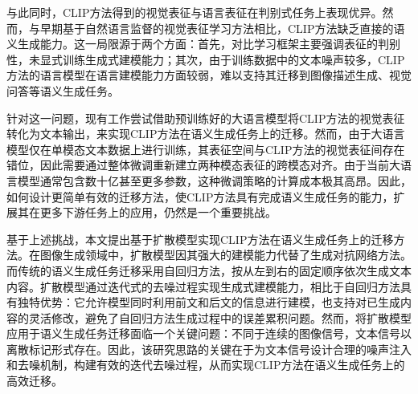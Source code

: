 与此同时，CLIP方法得到的视觉表征与语言表征在判别式任务上表现优异。然而，与早期基于自然语言监督的视觉表征学习方法\cite{desai2021virtex}相比，CLIP方法缺乏直接的语义生成能力。这一局限源于两个方面：首先，对比学习框架主要强调表征的判别性，未显式训练生成式建模能力；其次，由于训练数据中的文本噪声较多，CLIP方法的语言模型在语言建模能力方面较弱，难以支持其迁移到图像描述生成、视觉问答等语义生成任务。

针对这一问题，现有工作尝试借助预训练好的大语言模型将CLIP方法的视觉表征转化为文本输出，来实现CLIP方法在语义生成任务上的迁移。然而，由于大语言模型仅在单模态文本数据上进行训练，其表征空间与CLIP方法的视觉表征间存在错位，因此需要通过整体微调重新建立两种模态表征的跨模态对齐。由于当前大语言模型通常包含数十亿甚至更多参数，这种微调策略的计算成本极其高昂。因此，如何设计更简单有效的迁移方法，使CLIP方法具有完成语义生成任务的能力，扩展其在更多下游任务上的应用，仍然是一个重要挑战。

基于上述挑战，本文提出基于扩散模型实现CLIP方法在语义生成任务上的迁移方法。在图像生成领域中，扩散模型\cite{ddim,ddpm}因其强大的建模能力代替了生成对抗网络方法。而传统的语义生成任务迁移采用自回归方法\cite{gpt2}，按从左到右的固定顺序依次生成文本内容。扩散模型通过迭代式的去噪过程实现生成式建模能力，相比于自回归方法具有独特优势：它允许模型同时利用前文和后文的信息进行建模，也支持对已生成内容的灵活修改，避免了自回归方法生成过程中的误差累积问题。然而，将扩散模型应用于语义生成任务迁移面临一个关键问题：不同于连续的图像信号，文本信号以离散标记形式存在。因此，该研究思路的关键在于为文本信号设计合理的噪声注入和去噪机制，构建有效的迭代去噪过程，从而实现CLIP方法在语义生成任务上的高效迁移。


